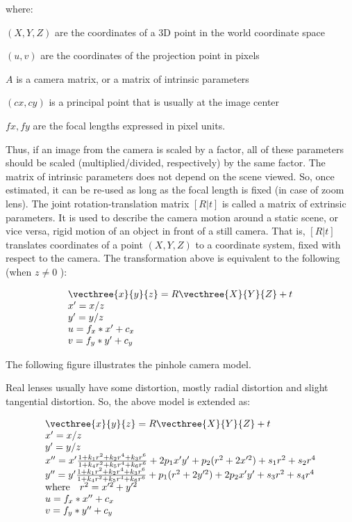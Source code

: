 where\+: 


\begin{DoxyItemize}
\item $(X, Y, Z)$ are the coordinates of a 3D point in the world coordinate space
\item $(u, v)$ are the coordinates of the projection point in pixels
\item $A$ is a camera matrix, or a matrix of intrinsic parameters
\item $(cx, cy)$ is a principal point that is usually at the image center
\item $fx, fy$ are the focal lengths expressed in pixel units. 
\end{DoxyItemize}

Thus, if an image from the camera is scaled by a factor, all of these parameters should be scaled (multiplied/divided, respectively) by the same factor. The matrix of intrinsic parameters does not depend on the scene viewed. So, once estimated, it can be re-\/used as long as the focal length is fixed (in case of zoom lens). The joint rotation-\/translation matrix $[R|t]$ is called a matrix of extrinsic parameters. It is used to describe the camera motion around a static scene, or vice versa, rigid motion of an object in front of a still camera. That is, $[R|t]$ translates coordinates of a point $(X, Y, Z)$ to a coordinate system, fixed with respect to the camera. The transformation above is equivalent to the following (when $z \ne 0$ )\+: 

\[\begin{array}{l} \vecthree{x}{y}{z} = R \vecthree{X}{Y}{Z} + t \\ x' = x/z \\ y' = y/z \\ u = f_x*x' + c_x \\ v = f_y*y' + c_y \end{array}\] 

The following figure illustrates the pinhole camera model. 

 

Real lenses usually have some distortion, mostly radial distortion and slight tangential distortion. So, the above model is extended as\+: 

\[\begin{array}{l} \vecthree{x}{y}{z} = R \vecthree{X}{Y}{Z} + t \\ x' = x/z \\ y' = y/z \\ x'' = x' \frac{1 + k_1 r^2 + k_2 r^4 + k_3 r^6}{1 + k_4 r^2 + k_5 r^4 + k_6 r^6} + 2 p_1 x' y' + p_2(r^2 + 2 x'^2) + s_1 r^2 + s_2 r^4 \\ y'' = y' \frac{1 + k_1 r^2 + k_2 r^4 + k_3 r^6}{1 + k_4 r^2 + k_5 r^4 + k_6 r^6} + p_1 (r^2 + 2 y'^2) + 2 p_2 x' y' + s_3 r^2 + s_4 r^4 \\ \text{where} \quad r^2 = x'^2 + y'^2 \\ u = f_x*x'' + c_x \\ v = f_y*y'' + c_y \end{array}\] 

